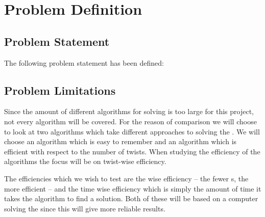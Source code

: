 \chapter{Problem Definition}
\emptyTop{}
\section{Problem Statement}
The following problem statement has been defined:




\section{Problem Limitations}
\label{sec:problemLimitations}
Since the amount of different algorithms for \rubik{} solving is too large for this project, not every algorithm will be covered.
For the reason of comparison we will choose to look at two algorithms which take different approaches to solving the \rubik{}.
We will choose an algorithm which is easy to remember and an algorithm which is efficient with respect to the number of twists. When studying the efficiency of the algorithms the focus will be on twist-wise efficiency.

The efficiencies which we wish to test are the \twist{} wise efficiency -- the fewer \twist{}s, the more efficient -- and the time wise efficiency which is simply the amount of time it takes the algorithm to find a solution.
Both of these will be based on a computer solving the \rubik{} since this will give more reliable results.

